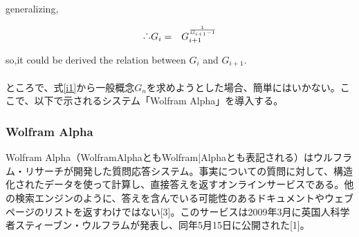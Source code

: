 \documentclass[12pt]{jsarticle}
\begin{document}
generalizing,

\begin{eqnarray}
\raisebox{.2ex}{.}\raisebox{1.2ex}{.}\raisebox{.2ex}{.} G_{i}&=&G_{i+1}^{\frac{1}{G_{i+1}-1}}
 \label{i1}
 \end{eqnarray}

so,it could be  derived the relation between $G_{i}$ and $G_{i+1}$.\\
\\
ところで、式\ref{i1}から一般概念$G_{n}$を求めようとした場合、簡単にはいかない。ここで、以下で示されるシステム「Wolfram Alpha」を導入する。\\

\newpage
\subsubsection{Wolfram Alpha}
Wolfram Alpha（WolframAlphaともWolfram|Alphaとも表記される）はウルフラム・リサーチが開発した質問応答システム。事実についての質問に対して、構造化されたデータを使って計算し、直接答えを返すオンラインサービスである。他の検索エンジンのように、答えを含んでいる可能性のあるドキュメントやウェブページのリストを返すわけではない[3]。このサービスは2009年3月に英国人科学者スティーブン・ウルフラムが発表し、同年5月15日に公開された[1]。
\end{document}
